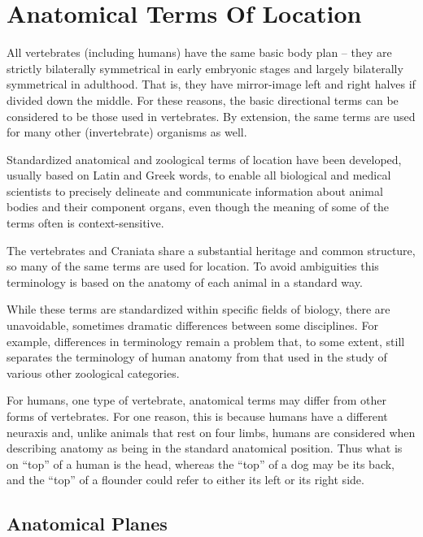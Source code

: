 \hypertarget{appendix-appendix}{%
\appendix}


\hypertarget{anatomical-terms-of-location}{%
\chapter{Anatomical Terms Of Location}\label{anatomical-terms-of-location}}

All vertebrates (including humans) have the same basic body plan -- they are strictly bilaterally symmetrical in early embryonic stages and largely bilaterally symmetrical in adulthood. That is, they have mirror-image left and right halves if divided down the middle. For these reasons, the basic directional terms can be considered to be those used in vertebrates. By extension, the same terms are used for many other (invertebrate) organisms as well.

Standardized anatomical and zoological terms of location have been developed, usually based on Latin and Greek words, to enable all biological and medical scientists to precisely delineate and communicate information about animal bodies and their component organs, even though the meaning of some of the terms often is context-sensitive.

The vertebrates and Craniata share a substantial heritage and common structure, so many of the same terms are used for location. To avoid ambiguities this terminology is based on the anatomy of each animal in a standard way.

While these terms are standardized within specific fields of biology, there are unavoidable, sometimes dramatic differences between some disciplines. For example, differences in terminology remain a problem that, to some extent, still separates the terminology of human anatomy from that used in the study of various other zoological categories.

For humans, one type of vertebrate, anatomical terms may differ from other forms of vertebrates. For one reason, this is because humans have a different neuraxis and, unlike animals that rest on four limbs, humans are considered when describing anatomy as being in the standard anatomical position. Thus what is on ``top'' of a human is the head, whereas the ``top'' of a dog may be its back, and the ``top'' of a flounder could refer to either its left or its right side.

\hypertarget{anatomical-planes}{%
\section{Anatomical Planes}\label{anatomical-planes}}

